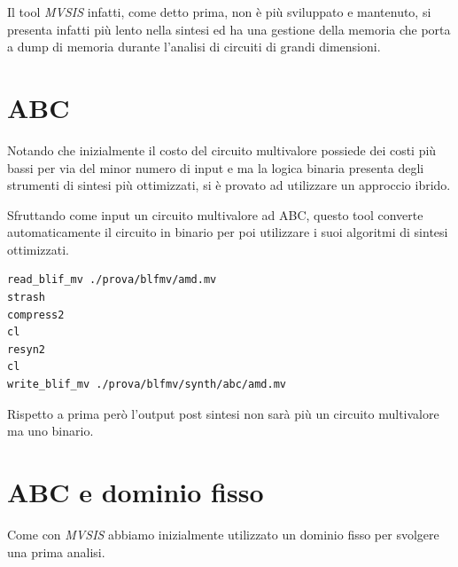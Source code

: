 \documentclass[
  italian,
]{book}
\begin{document}
Il tool \emph{MVSIS} infatti, come detto prima, non è più sviluppato e mantenuto, si presenta infatti più lento nella sintesi ed ha una gestione della memoria che porta a dump di memoria durante l'analisi di circuiti di grandi dimensioni.

\newpage

\hypertarget{abc-2}{%
\section{ABC}\label{abc-2}}

Notando che inizialmente il costo del circuito multivalore possiede dei costi più bassi per via del minor numero di input e ma la logica binaria presenta degli strumenti di sintesi più ottimizzati, si è provato ad utilizzare un approccio ibrido.

Sfruttando come input un circuito multivalore ad ABC, questo tool converte automaticamente il circuito in binario per poi utilizzare i suoi algoritmi di sintesi ottimizzati.

\begin{verbatim}
read_blif_mv ./prova/blfmv/amd.mv
strash
compress2
cl
resyn2
cl
write_blif_mv ./prova/blfmv/synth/abc/amd.mv
\end{verbatim}

Rispetto a prima però l'output post sintesi non sarà più un circuito multivalore ma uno binario.

\hypertarget{abc-e-dominio-fisso}{%
\section{ABC e dominio fisso}\label{abc-e-dominio-fisso}}

Come con \emph{MVSIS} abbiamo inizialmente utilizzato un dominio fisso per svolgere una prima analisi.
\end{document}
